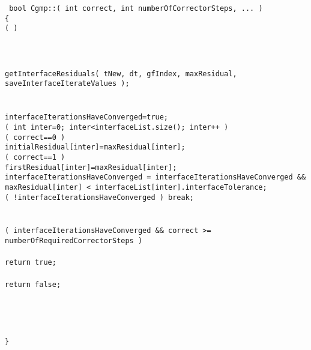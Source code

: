 \begin{flushleft}\tt\small
bool Cgmp::( int correct, int numberOfCorrectorSteps, ... ) \\
\{  \\
\ia  \IF(  )  \\
\ib \\
\ib    {} \\
\ib    {} \\
\ib    getInterfaceResiduals( tNew, dt, gfIndex, maxResidual, saveInterfaceIterateValues ); \\
\ib \\
\ib    {} \\
\ib    interfaceIterationsHaveConverged=true; \\
\ib    \FOR( int inter=0; inter<interfaceList.size(); inter++ ) \\
\ic      \IF( correct==0 )  \\
\id        initialResidual[inter]=maxResidual[inter];  \\
\ic      \ELSEIF( correct==1 )   \\
\id        firstResidual[inter]=maxResidual[inter];    \\
\ic      \END
\ie     interfaceIterationsHaveConverged = interfaceIterationsHaveConverged \&\& \\
\ie     \qquad maxResidual[inter] < interfaceList[inter].interfaceTolerance; \\
\ic     \IF( !interfaceIterationsHaveConverged ) break; \\
\ib    \END \\ 
\ib \\
\ib    \IF( interfaceIterationsHaveConverged  \&\& correct >= numberOfRequiredCorrectorSteps )  \\
\ic       {} \\
\ic       return true;  \\
\ib    \ELSE \\
\ic       return false; \\ 
\ib    \END \\
\ia \\ 
\ia  \END \\
\ia \\
\}
\end{flushleft}


